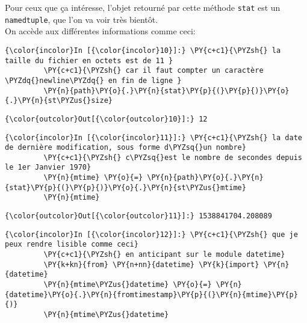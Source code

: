     Pour ceux que ça intéresse, l'objet retourné par cette méthode
\texttt{stat} est un \texttt{namedtuple}, que l'on va voir très bientôt.\\

On accède aux différentes informations comme ceci:

    \begin{Verbatim}[commandchars=\\\{\}]
{\color{incolor}In [{\color{incolor}10}]:} \PY{c+c1}{\PYZsh{} la taille du fichier en octets est de 11 }
         \PY{c+c1}{\PYZsh{} car il faut compter un caractère \PYZdq{}newline\PYZdq{} en fin de ligne }
         \PY{n}{path}\PY{o}{.}\PY{n}{stat}\PY{p}{(}\PY{p}{)}\PY{o}{.}\PY{n}{st\PYZus{}size}
\end{Verbatim}


\begin{Verbatim}[commandchars=\\\{\}]
{\color{outcolor}Out[{\color{outcolor}10}]:} 12
\end{Verbatim}
            
    \begin{Verbatim}[commandchars=\\\{\}]
{\color{incolor}In [{\color{incolor}11}]:} \PY{c+c1}{\PYZsh{} la date de dernière modification, sous forme d\PYZsq{}un nombre}
         \PY{c+c1}{\PYZsh{} c\PYZsq{}est le nombre de secondes depuis le 1er Janvier 1970}
         \PY{n}{mtime} \PY{o}{=} \PY{n}{path}\PY{o}{.}\PY{n}{stat}\PY{p}{(}\PY{p}{)}\PY{o}{.}\PY{n}{st\PYZus{}mtime}
         \PY{n}{mtime}
\end{Verbatim}


\begin{Verbatim}[commandchars=\\\{\}]
{\color{outcolor}Out[{\color{outcolor}11}]:} 1538841704.208089
\end{Verbatim}
            
    \begin{Verbatim}[commandchars=\\\{\}]
{\color{incolor}In [{\color{incolor}12}]:} \PY{c+c1}{\PYZsh{} que je peux rendre lisible comme ceci}
         \PY{c+c1}{\PYZsh{} en anticipant sur le module datetime}
         \PY{k+kn}{from} \PY{n+nn}{datetime} \PY{k}{import} \PY{n}{datetime}
         \PY{n}{mtime\PYZus{}datetime} \PY{o}{=} \PY{n}{datetime}\PY{o}{.}\PY{n}{fromtimestamp}\PY{p}{(}\PY{n}{mtime}\PY{p}{)}
         \PY{n}{mtime\PYZus{}datetime}
\end{Verbatim}


